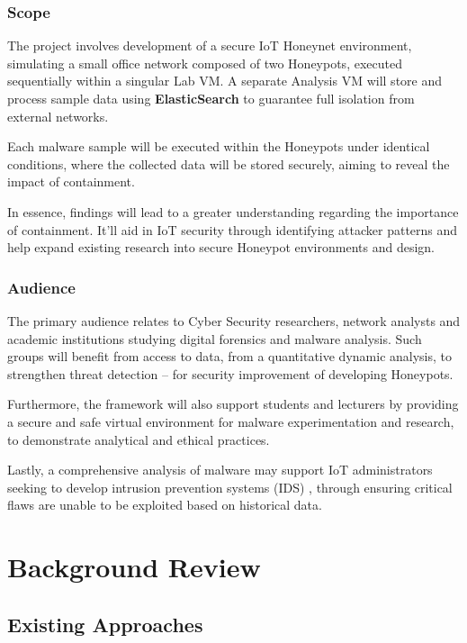 \documentclass[a4paper,12pt,oneside]{book}			%
\begin{document}
\subsection{Scope}\label{sec:scope}

The project involves development of a secure IoT Honeynet environment, simulating a small office network composed of two Honeypots, executed sequentially within a singular Lab VM. A separate Analysis VM will store and process sample data using \textbf{ElasticSearch} to guarantee full isolation from external networks.

Each malware sample will be executed within the Honeypots under identical conditions, where the collected data will be stored securely, aiming to reveal the impact of containment.

In essence, findings will lead to a greater understanding regarding the importance of containment. It’ll aid in IoT security through identifying attacker patterns \textit{\citep{Kocaogullar2023honeypots}} and help expand existing research into secure Honeypot environments and design.

\subsection{Audience}\label{sec:audience}

The primary audience relates to Cyber Security researchers, network analysts and academic institutions studying digital forensics and malware analysis. Such groups will benefit from access to data, from a quantitative dynamic analysis, to strengthen threat detection -- for security improvement of developing Honeypots.

Furthermore, the framework will also support students and lecturers by providing a secure and safe virtual environment for malware experimentation and research, to demonstrate analytical and ethical practices. 

Lastly, a comprehensive analysis of malware may support IoT administrators seeking to develop intrusion prevention systems (IDS) \textit{\citep{fortinet-IDS}}, through ensuring critical flaws are unable to be exploited based on historical data.


\chapter{Background Review}\label{ch:backgroundReview}

\section{Existing Approaches}\label{sec:existingApproaches}
\end{document}
